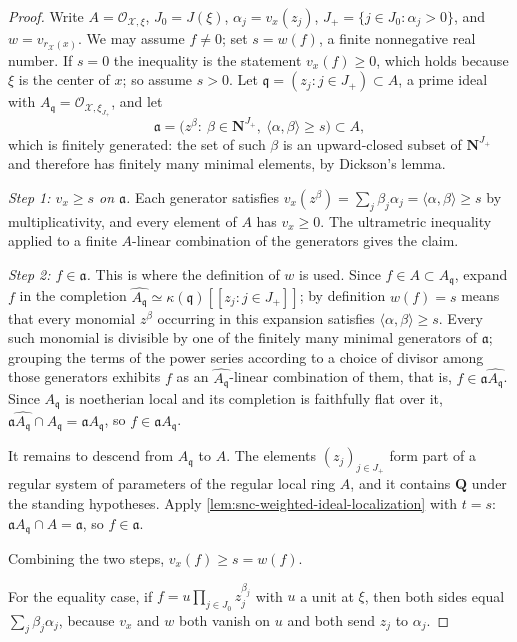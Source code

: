 \begin{proof}
Write $A=\mathcal O_{\mathcal X,\xi}$, $J_0=J(\xi)$,
$\alpha_j=v_x(z_j)$, $J_+=\{j\in J_0:\alpha_j>0\}$, and
$w=v_{r_{\mathcal X}(x)}$. We may assume $f\neq0$; set $s=w(f)$, a
finite nonnegative real number. If $s=0$ the inequality is the statement
$v_x(f)\ge0$, which holds because $\xi$ is the center of $x$; so
assume $s>0$. Let $\mathfrak q=(z_j:j\in J_+)\subset A$, a prime ideal
with $A_{\mathfrak q}=\mathcal O_{\mathcal X,\xi_{J_+}}$, and let
\[
 \mathfrak a=\bigl(z^\beta:\ \beta\in\mathbf N^{J_+},\
   \langle\alpha,\beta\rangle\ge s\bigr)\subset A,
\]
which is finitely generated: the set of such $\beta$ is an upward-closed
subset of $\mathbf N^{J_+}$ and therefore has finitely many minimal
elements, by Dickson's lemma.

\emph{Step 1: $v_x\ge s$ on $\mathfrak a$.} Each generator satisfies
$v_x(z^\beta)=\sum_j\beta_j\alpha_j=\langle\alpha,\beta\rangle\ge s$ by
multiplicativity, and every element of $A$ has $v_x\ge0$. The
ultrametric inequality applied to a finite $A$-linear combination of the
generators gives the claim.

\emph{Step 2: $f\in\mathfrak a$.} This is where the definition of $w$
is used. Since $f\in A\subset A_{\mathfrak q}$, expand $f$ in the
completion
$\widehat{A_{\mathfrak q}}\simeq\kappa(\mathfrak q)[[z_j:j\in J_+]]$;
by definition $w(f)=s$ means that every monomial $z^\beta$ occurring in
this expansion satisfies $\langle\alpha,\beta\rangle\ge s$. Every such
monomial is divisible by one of the finitely many minimal generators of
$\mathfrak a$; grouping the terms of the power series according to a
choice of divisor among those generators exhibits $f$ as an
$\widehat{A_{\mathfrak q}}$-linear combination of them, that is,
$f\in\mathfrak a\widehat{A_{\mathfrak q}}$. Since $A_{\mathfrak q}$ is
noetherian local and its completion is faithfully flat over it,
$\mathfrak a\widehat{A_{\mathfrak q}}\cap A_{\mathfrak q}
 =\mathfrak aA_{\mathfrak q}$, so $f\in\mathfrak aA_{\mathfrak q}$.

It remains to descend from $A_{\mathfrak q}$ to $A$. The elements
$(z_j)_{j\in J_+}$ form part of a regular system of parameters of the
regular local ring $A$, and it contains $\mathbf Q$ under the standing
hypotheses. Apply \cref{lem:snc-weighted-ideal-localization} with $t=s$:
$\mathfrak aA_{\mathfrak q}\cap A=\mathfrak a$, so $f\in\mathfrak a$.

Combining the two steps, $v_x(f)\ge s=w(f)$.

For the equality case, if $f=u\prod_{j\in J_0}z_j^{\beta_j}$ with $u$ a
unit at $\xi$, then both sides equal
$\sum_{j}\beta_j\alpha_j$, because $v_x$ and $w$ both vanish on $u$
and both send $z_j$ to $\alpha_j$.
\end{proof}

